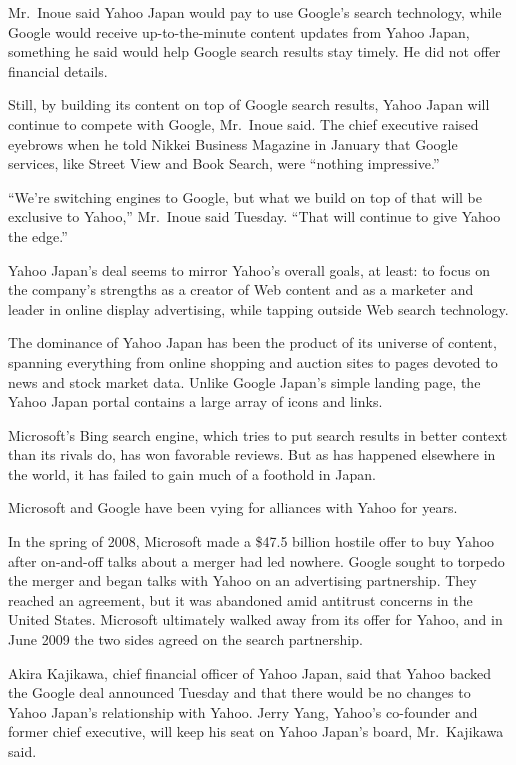 ﻿\documentclass[12pt]{article}
\begin{document}
Mr.~Inoue said Yahoo Japan would pay to use Google's search technology, while Google would receive
up-to-the-minute content updates from Yahoo Japan, something he said would help Google search
results stay timely. He did not offer financial details.

Still, by building its content on top of Google search results, Yahoo Japan will continue to compete
with Google, Mr.~Inoue said. The chief executive raised eyebrows when he told Nikkei Business
Magazine in January that Google services, like Street View and Book Search, were ``nothing
impressive.''

``We're switching engines to Google, but what we build on top of that will be exclusive to Yahoo,''
Mr.~Inoue said Tuesday. ``That will continue to give Yahoo the edge.''

Yahoo Japan's deal seems to mirror Yahoo's overall goals, at least: to focus on the company's
strengths as a creator of Web content and as a marketer and leader in online display advertising,
while tapping outside Web search technology.

The dominance of Yahoo Japan has been the product of its universe of content, spanning everything
from online shopping and auction sites to pages devoted to news and stock market data. Unlike Google
Japan's simple landing page, the Yahoo Japan portal contains a large array of icons and links.

Microsoft's Bing search engine, which tries to put search results in better context than its rivals
do, has won favorable reviews. But as has happened elsewhere in the world, it has failed to gain
much of a foothold in Japan.

Microsoft and Google have been vying for alliances with Yahoo for years.

In the spring of 2008, Microsoft made a \$47.5 billion hostile offer to buy Yahoo after on-and-off
talks about a merger had led nowhere. Google sought to torpedo the merger and began talks with Yahoo
on an advertising partnership. They reached an agreement, but it was abandoned amid antitrust
concerns in the United States. Microsoft ultimately walked away from its offer for Yahoo, and in
June 2009 the two sides agreed on the search partnership.

Akira Kajikawa, chief financial officer of Yahoo Japan, said that Yahoo backed the Google deal
announced Tuesday and that there would be no changes to Yahoo Japan's relationship with Yahoo. Jerry
Yang, Yahoo's co-founder and former chief executive, will keep his seat on Yahoo Japan's board,
Mr.~Kajikawa said.
\end{document}
